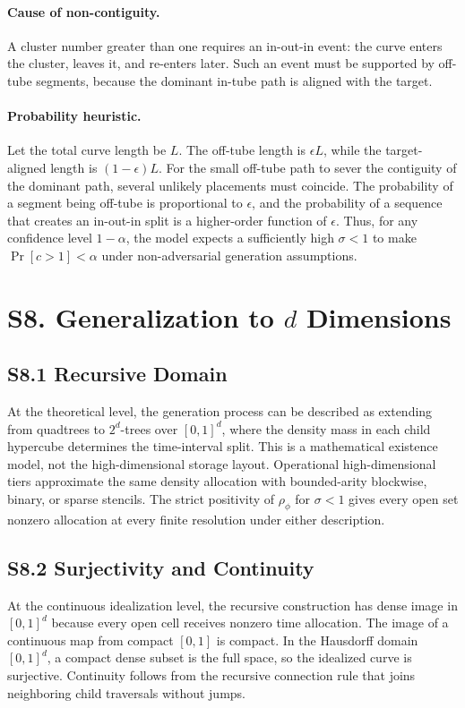 \documentclass[11pt]{article}
\newcommand{\unitd}{[0,1]^d}
\begin{document}
\paragraph{Cause of non-contiguity.}
A cluster number greater than one requires an in-out-in event: the curve enters the cluster, leaves it, and re-enters later. Such an event must be supported by off-tube segments, because the dominant in-tube path is aligned with the target.

\paragraph{Probability heuristic.}
Let the total curve length be $L$. The off-tube length is $\epsilon L$, while the target-aligned length is $(1-\epsilon)L$. For the small off-tube path to sever the contiguity of the dominant path, several unlikely placements must coincide. The probability of a segment being off-tube is proportional to $\epsilon$, and the probability of a sequence that creates an in-out-in split is a higher-order function of $\epsilon$. Thus, for any confidence level $1-\alpha$, the model expects a sufficiently high $\sigma<1$ to make $\Pr[c>1]<\alpha$ under non-adversarial generation assumptions.

\section*{S8. Generalization to $d$ Dimensions}
\label{sec:si-dimensions}

\subsection*{S8.1 Recursive Domain}
At the theoretical level, the generation process can be described as extending from quadtrees to $2^d$-trees over $\unitd$, where the density mass in each child hypercube determines the time-interval split. This is a mathematical existence model, not the high-dimensional storage layout. Operational high-dimensional tiers approximate the same density allocation with bounded-arity blockwise, binary, or sparse stencils. The strict positivity of $\rho_\phi$ for $\sigma<1$ gives every open set nonzero allocation at every finite resolution under either description.

\subsection*{S8.2 Surjectivity and Continuity}
At the continuous idealization level, the recursive construction has dense image in $\unitd$ because every open cell receives nonzero time allocation. The image of a continuous map from compact $[0,1]$ is compact. In the Hausdorff domain $\unitd$, a compact dense subset is the full space, so the idealized curve is surjective. Continuity follows from the recursive connection rule that joins neighboring child traversals without jumps.
\end{document}
